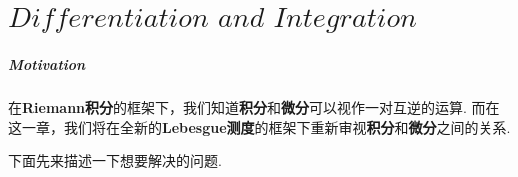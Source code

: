 \ifx\allfiles\undefined


	\else
	\fi
\chapter{$Differentiation \,\, and \,\, Integration$}
\paragraph{\textbf{Motivation}}
	在\textbf{Riemann积分}的框架下，我们知道\textbf{积分}和\textbf{微分}可以视作一对互逆的运算. 而在这一章，我们将在全新的\textbf{Lebesgue测度}的框架下重新审视\textbf{积分}和\textbf{微分}之间的关系.
	
	\vspace{1em}
	下面先来描述一下想要解决的问题.
